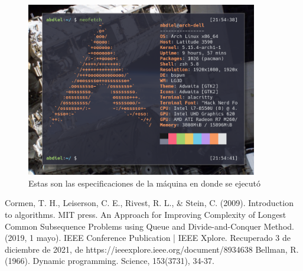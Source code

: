 \documentclass{article}
\begin{document}
    \begin{figure}[h!]
        \centering
        \includegraphics[width=0.9\textwidth]{specs.png}
        \caption{Estas son las especificaciones de la máquina en donde se ejecutó}
        \label{fig:my_label}
    \end{figure}
\newpage    
        
\begin{thebibliography}{}
    
        Cormen, T. H., Leiserson, C. E., Rivest, R. L., & Stein, C. (2009). Introduction to algorithms. MIT press.
        An Approach for Improving Complexity of Longest Common Subsequence Problems using Queue and Divide-and-Conquer Method. (2019, 1 mayo). IEEE Conference Publication | IEEE Xplore. Recuperado 3 de diciembre de 2021, de https://ieeexplore.ieee.org/document/8934638
        Bellman, R. (1966). Dynamic programming. Science, 153(3731), 34-37.

    \end{thebibliography}
\end{document}
